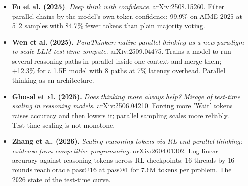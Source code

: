 \documentclass[11pt,letterpaper]{article}
\begin{document}
\begin{itemize}[leftmargin=1.2em,itemsep=3pt]
\item \textbf{Fu et al. (2025).} \textit{Deep think with confidence}. arXiv:2508.15260. Filter parallel chains by the model's own token confidence: 99.9\% on AIME 2025 at 512 samples with 84.7\% fewer tokens than plain majority voting.
\item \textbf{Wen et al. (2025).} \textit{ParaThinker: native parallel thinking as a new paradigm to scale LLM test-time compute}. arXiv:2509.04475. Trains a model to run several reasoning paths in parallel inside one context and merge them; +12.3\% for a 1.5B model with 8 paths at 7\% latency overhead. Parallel thinking as an architecture.
\item \textbf{Ghosal et al. (2025).} \textit{Does thinking more always help? Mirage of test-time scaling in reasoning models}. arXiv:2506.04210. Forcing more 'Wait' tokens raises accuracy and then lowers it; parallel sampling scales more reliably. Test-time scaling is not monotone.
\item \textbf{Zhang et al. (2026).} \textit{Scaling reasoning tokens via RL and parallel thinking: evidence from competitive programming}. arXiv:2604.01302. Log-linear accuracy against reasoning tokens across RL checkpoints; 16 threads by 16 rounds reach oracle pass@16 at pass@1 for 7.6M tokens per problem. The 2026 state of the test-time curve.
\end{itemize}
\end{document}
